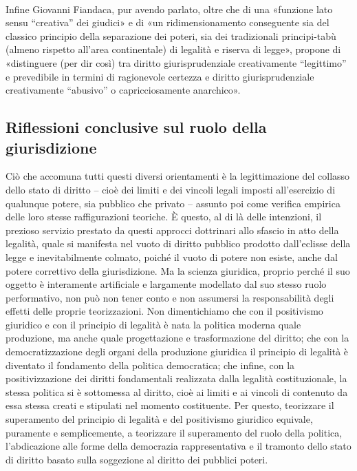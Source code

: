 \\Infine Giovanni Fiandaca, pur avendo parlato, oltre che di una «funzione lato sensu “creativa” dei giudici» e di «un ridimensionamento conseguente sia del classico principio della separazione dei poteri, sia dei tradizionali principi-tabù (almeno rispetto all’area continentale) di legalità e riserva di legge», propone di «distinguere (per dir così) tra diritto giurisprudenziale creativamente “legittimo” e prevedibile in termini di ragionevole certezza e diritto giurisprudenziale creativamente “abusivo” o capricciosamente anarchico».

\subsection{Riflessioni conclusive sul ruolo della giurisdizione}
Ciò che accomuna tutti questi diversi orientamenti è la legittimazione del collasso dello stato di diritto – cioè dei limiti e dei vincoli legali imposti all’esercizio di qualunque potere, sia pubblico che privato – assunto poi come verifica empirica delle loro stesse raffigurazioni teoriche. È questo, al di là delle intenzioni, il prezioso servizio prestato da questi approcci dottrinari allo sfascio in atto della legalità, quale si manifesta nel vuoto di diritto pubblico prodotto dall’eclisse della legge e inevitabilmente colmato, poiché il vuoto di potere non esiste, anche dal potere correttivo della giurisdizione.
Ma la scienza giuridica, proprio perché il suo oggetto è interamente artificiale e largamente modellato dal suo stesso ruolo performativo, non può non tener conto e non assumersi la responsabilità degli effetti delle proprie teorizzazioni. 
Non dimentichiamo che con il positivismo giuridico e con il principio di legalità è nata la politica moderna quale produzione, ma anche quale progettazione e trasformazione del diritto; che con la democratizzazione degli organi della produzione giuridica il principio di legalità è diventato il fondamento della politica democratica; che infine, con la positivizzazione dei diritti fondamentali realizzata dalla legalità costituzionale, la stessa politica si è sottomessa al diritto, cioè ai limiti e ai vincoli di contenuto da essa stessa creati e stipulati nel momento costituente. 
Per questo, teorizzare il superamento del principio di legalità e del positivismo giuridico equivale, puramente e semplicemente, a teorizzare il superamento del ruolo della politica, l’abdicazione alle forme della democrazia rappresentativa e il tramonto dello stato di diritto basato sulla soggezione al diritto dei pubblici poteri.
